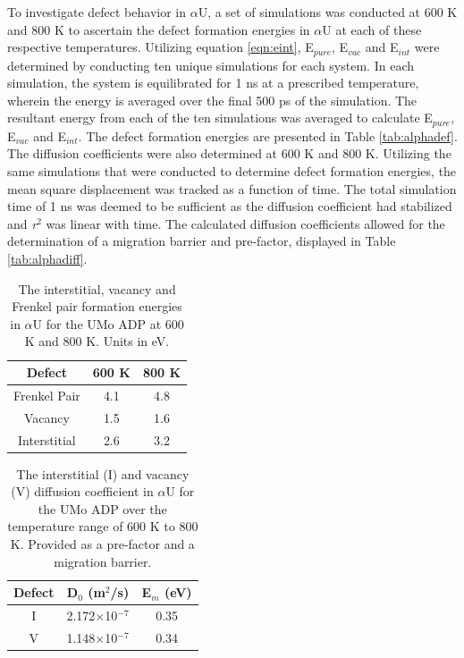 \documentclass[review]{elsarticle}
\begin{document}
\FloatBarrier

To investigate defect behavior in $\alpha$U, a set of simulations was conducted at 600 K and 800 K to ascertain the defect formation energies in $\alpha$U at each of these respective temperatures. Utilizing equation \ref{eqn:eint}, E$_{pure}$, E$_{vac}$ and E$_{int}$ were determined by conducting ten unique simulations for each system. In each simulation, the system is equilibrated for 1 ns at a prescribed temperature, wherein the energy is averaged over the final 500 ps of the simulation. The resultant energy from each of the ten simulations was averaged to calculate E$_{pure}$, E$_{vac}$ and E$_{int}$. The defect formation energies are presented in Table \ref{tab:alphadef}. The diffusion coefficients were also determined at 600 K and 800 K. Utilizing the same simulations that were conducted to determine defect formation energies, the mean square displacement was tracked as a function of time. The total simulation time of 1 ns was deemed to be sufficient as the diffusion coefficient had stabilized and \textit{r}$^{2}$ was linear with time. The calculated diffusion coefficients allowed for the determination of a migration barrier and pre-factor, displayed in Table \ref{tab:alphadiff}.

\begin{table}[h]
\caption{The interstitial, vacancy and Frenkel pair formation energies in $\alpha$U for the UMo ADP at 600 K and 800 K. Units in eV.} \label{tab:alphadef}
\begin{center}
\begin{tabular}{|c|c|c|}
	\hline
	Defect & 600 K & 800 K\\
	 \hline
	Frenkel Pair	& 4.1 & 4.8 \\
	Vacancy		& 1.5 & 1.6 \\
	Interstitial		& 2.6 & 3.2 \\
	\hline
\end{tabular}
\end{center}
\label{default}
\end{table}

\begin{table}[h]
\caption{The interstitial (I) and vacancy (V) diffusion coefficient in $\alpha$U for the UMo ADP over the temperature range of 600 K to 800 K. Provided as a pre-factor and a migration barrier.} \label{tab:alphadiff}
\begin{center}
\begin{tabular}{|c|c|c|}
	\hline
	Defect & D$_{0}$ (m$^{2}$/s) & E$_{m}$ (eV)\\
	 \hline
	 I & 2.172$\times$10$^{-7}$ & 0.35 \\
	 V & 1.148$\times$10$^{-7}$ & 0.34 \\
	\hline
\end{tabular}
\end{center}
\label{default}
\end{table}
\end{document}
